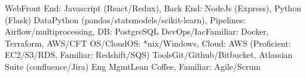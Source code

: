 \begin{additionals}
  \addional
    {Web}{Front End: Javascript (React/Redux), Back End: NodeJs (Express), Python (Flask)}
  \addional
    {Data}{Python (pandas/statsmodels/scikit-learn), Pipelines: Airflow/multiprocessing, DB: PostgreSQL}
  \addional
    {DevOps/Iac}{Familiar: Docker, Terraform, AWS/CFT}
  \addional
    {OS/Cloud}{OS: *nix/Windows, Cloud: AWS (Proficient: EC2/S3/RDS, Familiar: Redshift/SQS)}
  \addional
    {Tools}{Git/Github/Bitbucket, Atlassian Suite (confluence/Jira)}
  \addional
    {Eng Mgmt}{Lean Coffee, Familiar: Agile/Scrum}
\end{additionals}


